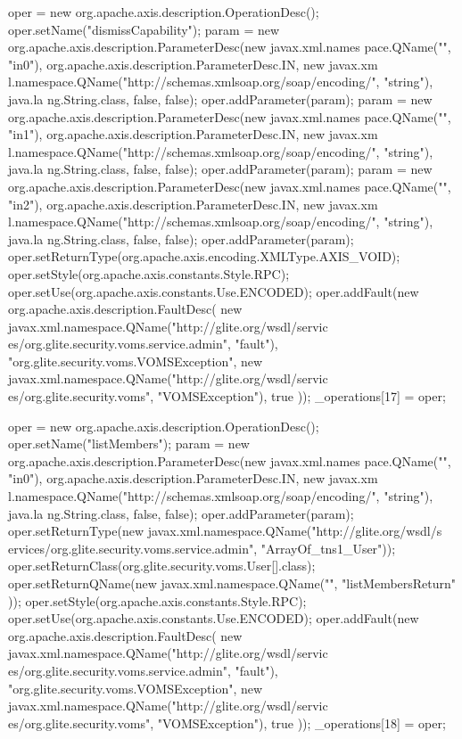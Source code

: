 \begin{DoxyCode}
{        oper = new org.apache.axis.description.OperationDesc();
        oper.setName("dismissCapability");
        param = new org.apache.axis.description.ParameterDesc(new javax.xml.names
      pace.QName("", "in0"), org.apache.axis.description.ParameterDesc.IN, new javax.xm
      l.namespace.QName("http://schemas.xmlsoap.org/soap/encoding/", "string"), java.la
      ng.String.class, false, false);
        oper.addParameter(param);
        param = new org.apache.axis.description.ParameterDesc(new javax.xml.names
      pace.QName("", "in1"), org.apache.axis.description.ParameterDesc.IN, new javax.xm
      l.namespace.QName("http://schemas.xmlsoap.org/soap/encoding/", "string"), java.la
      ng.String.class, false, false);
        oper.addParameter(param);
        param = new org.apache.axis.description.ParameterDesc(new javax.xml.names
      pace.QName("", "in2"), org.apache.axis.description.ParameterDesc.IN, new javax.xm
      l.namespace.QName("http://schemas.xmlsoap.org/soap/encoding/", "string"), java.la
      ng.String.class, false, false);
        oper.addParameter(param);
        oper.setReturnType(org.apache.axis.encoding.XMLType.AXIS_VOID);
        oper.setStyle(org.apache.axis.constants.Style.RPC);
        oper.setUse(org.apache.axis.constants.Use.ENCODED);
        oper.addFault(new org.apache.axis.description.FaultDesc(
                      new javax.xml.namespace.QName("http://glite.org/wsdl/servic
      es/org.glite.security.voms.service.admin", "fault"),
                      "org.glite.security.voms.VOMSException",
                      new javax.xml.namespace.QName("http://glite.org/wsdl/servic
      es/org.glite.security.voms", "VOMSException"), 
                      true
                     ));
        _operations[17] = oper;

        oper = new org.apache.axis.description.OperationDesc();
        oper.setName("listMembers");
        param = new org.apache.axis.description.ParameterDesc(new javax.xml.names
      pace.QName("", "in0"), org.apache.axis.description.ParameterDesc.IN, new javax.xm
      l.namespace.QName("http://schemas.xmlsoap.org/soap/encoding/", "string"), java.la
      ng.String.class, false, false);
        oper.addParameter(param);
        oper.setReturnType(new javax.xml.namespace.QName("http://glite.org/wsdl/s
      ervices/org.glite.security.voms.service.admin", "ArrayOf_tns1_User"));
        oper.setReturnClass(org.glite.security.voms.User[].class);
        oper.setReturnQName(new javax.xml.namespace.QName("", "listMembersReturn"
      ));
        oper.setStyle(org.apache.axis.constants.Style.RPC);
        oper.setUse(org.apache.axis.constants.Use.ENCODED);
        oper.addFault(new org.apache.axis.description.FaultDesc(
                      new javax.xml.namespace.QName("http://glite.org/wsdl/servic
      es/org.glite.security.voms.service.admin", "fault"),
                      "org.glite.security.voms.VOMSException",
                      new javax.xml.namespace.QName("http://glite.org/wsdl/servic
      es/org.glite.security.voms", "VOMSException"), 
                      true
                     ));
        _operations[18] = oper;

}
\end{DoxyCode}
